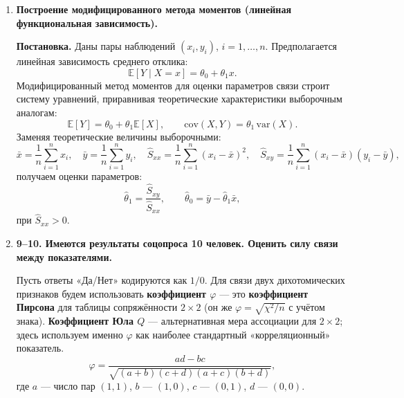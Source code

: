 \documentclass[12pt,a4paper]{article}
\begin{document}
\begin{enumerate}[label=\textbf{\arabic*.}]
\textbf{2) Модель $M/M/c$ (возьмём $c=2$, пример с вычислениями).}
\[
\lambda=3\ \text{заявки/мин},\qquad \mu=2\ \text{заявки/мин},\qquad c=2.
\]
Загрузка системы:
\[
\rho=\frac{\lambda}{c\mu}=\frac{3}{2\cdot 2}=0.75<1.
\]
Обозначим $\alpha=\lambda/\mu=1.5$. Тогда
\[
P_0=\left(\sum_{n=0}^{c-1}\frac{\alpha^n}{n!}+\frac{\alpha^c}{c!}\cdot \frac{1}{1-\rho}\right)^{-1}
=\left(1+\alpha+\frac{\alpha^2}{2}\cdot\frac{1}{1-\rho}\right)^{-1}.
\]
Подстановка чисел:
\[
P_0=\left(1+1.5+\frac{2.25}{2}\cdot\frac{1}{0.25}\right)^{-1}
=\left(2.5+1.125\cdot 4\right)^{-1}
=\frac{1}{7}.
\]
Вероятность ожидания (формула Эрланга~C):
\[
P_{\text{wait}}=\frac{\alpha^c}{c!}\cdot\frac{1}{1-\rho}\cdot P_0
=\frac{2.25}{2}\cdot 4\cdot \frac{1}{7}
=\frac{4.5}{7}\approx 0.643.
\]
Средняя длина очереди:
\[
L_q=P_{\text{wait}}\cdot \frac{\rho}{1-\rho}
=\frac{4.5}{7}\cdot \frac{0.75}{0.25}
=\frac{4.5}{7}\cdot 3
=\frac{13.5}{7}\approx 1.929.
\]
Среднее время ожидания:
\[
W_q=\frac{L_q}{\lambda}\approx \frac{1.929}{3}\approx 0.643\ \text{мин},
\]
а среднее время в системе:
\[
W=W_q+\frac{1}{\mu}\approx 0.643+0.5=1.143\ \text{мин}.
\]

\item \textbf{Построение модифицированного метода моментов (линейная функциональная зависимость).}

\textbf{Постановка.} Даны пары наблюдений $(x_i,y_i)$, $i=1,\dots,n$. Предполагается линейная зависимость среднего отклика:
\[
\mathbb{E}[Y\mid X=x]=\theta_0+\theta_1 x.
\]
Модифицированный метод моментов для оценки параметров связи строит систему уравнений, приравнивая теоретические характеристики выборочным аналогам:
\[
\mathbb{E}[Y]=\theta_0+\theta_1\mathbb{E}[X],\qquad
\mathrm{cov}(X,Y)=\theta_1\,\mathrm{var}(X).
\]
Заменяя теоретические величины выборочными:
\[
\bar x=\frac1n\sum_{i=1}^n x_i,\quad
\bar y=\frac1n\sum_{i=1}^n y_i,\quad
\widehat S_{xx}=\frac1n\sum_{i=1}^n (x_i-\bar x)^2,\quad
\widehat S_{xy}=\frac1n\sum_{i=1}^n (x_i-\bar x)(y_i-\bar y),
\]
получаем оценки параметров:
\[
\hat\theta_1=\frac{\widehat S_{xy}}{\widehat S_{xx}},\qquad
\hat\theta_0=\bar y-\hat\theta_1\bar x,
\]
при $\widehat S_{xx}>0$.

\item \textbf{9–10. Имеются результаты соцопроса 10 человек. Оценить силу связи между показателями.}

Пусть ответы «Да/Нет» кодируются как $1/0$. Для связи двух дихотомических признаков будем использовать \textbf{коэффициент $\varphi$} — это \textbf{коэффициент Пирсона} для таблицы сопряжённости $2\times2$ (он же $\varphi=\sqrt{\chi^2/n}$ с учётом знака). \textbf{Коэффициент Юла $Q$} — альтернативная мера ассоциации для $2\times2$; здесь используем именно $\varphi$ как наиболее стандартный «корреляционный» показатель.
\[
\varphi=\frac{ad-bc}{\sqrt{(a+b)(c+d)(a+c)(b+d)}},
\]
где $a$ — число пар $(1,1)$, $b$ — $(1,0)$, $c$ — $(0,1)$, $d$ — $(0,0)$.


\end{enumerate}
\end{document}
